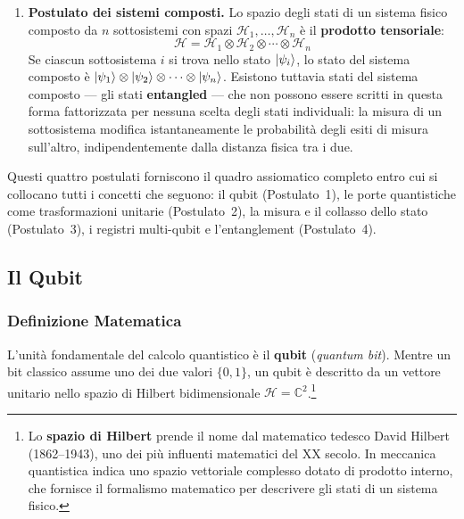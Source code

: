 \begin{onehalfspace}
\begin{enumerate}
    \item \textbf{Postulato dei sistemi composti.} Lo spazio degli stati di un sistema fisico composto da $n$ sottosistemi con spazi $\mathcal{H}_1, \ldots, \mathcal{H}_n$ è il \textbf{prodotto tensoriale}:
    \begin{equation}
        \mathcal{H} = \mathcal{H}_1 \otimes \mathcal{H}_2 \otimes \cdots \otimes \mathcal{H}_n
    \end{equation}
    Se ciascun sottosistema $i$ si trova nello stato $\ket{\psi_i}$, lo stato del sistema composto è $\ket{\psi_1} \otimes \ket{\psi_2} \otimes \cdots \otimes \ket{\psi_n}$. Esistono tuttavia stati del sistema composto --- gli stati \textbf{entangled} --- che non possono essere scritti in questa forma fattorizzata per nessuna scelta degli stati individuali: la misura di un sottosistema modifica istantaneamente le probabilità degli esiti di misura sull'altro, indipendentemente dalla distanza fisica tra i due.
\end{enumerate}

Questi quattro postulati forniscono il quadro assiomatico completo entro cui si collocano tutti i concetti che seguono: il qubit (Postulato~1), le porte quantistiche come trasformazioni unitarie (Postulato~2), la misura e il collasso dello stato (Postulato~3), i registri multi-qubit e l'entanglement (Postulato~4).

\clearpage
\subsection{Il Qubit}

\subsubsection{Definizione Matematica}

L'unità fondamentale del calcolo quantistico è il \textbf{qubit} (\textit{quantum bit}). Mentre un bit classico assume uno dei due valori $\{0, 1\}$, un qubit è descritto da un vettore unitario nello spazio di Hilbert bidimensionale $\mathcal{H} = \mathbb{C}^2$.\footnote{Lo \textbf{spazio di Hilbert} prende il nome dal matematico tedesco David Hilbert (1862--1943), uno dei più influenti matematici del XX secolo. In meccanica quantistica indica uno spazio vettoriale complesso dotato di prodotto interno, che fornisce il formalismo matematico per descrivere gli stati di un sistema fisico.}


\end{onehalfspace}
